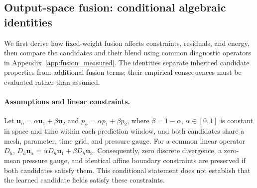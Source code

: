 
\subsection{Output-space fusion: conditional algebraic identities}
\label{app:fusion_consistency}

We first derive how fixed-weight fusion affects constraints, residuals,
and energy, then compare the candidates and their blend using common
diagnostic operators in Appendix~\ref{app:fusion_measured}. The identities
separate inherited candidate properties from additional fusion terms;
their empirical consequences must be evaluated rather than assumed.

\paragraph{Assumptions and linear constraints.}
Let $\bm u_\alpha=\alpha\bm u_1+\beta\bm u_2$ and
$p_\alpha=\alpha p_1+\beta p_2$, where $\beta=1-\alpha$,
$\alpha\in[0,1]$ is constant in space and time within each prediction
window, and both candidates share a mesh, parameter, time grid, and
pressure gauge. For a common linear operator $D_h$,
$D_h\bm u_\alpha=\alpha D_h\bm u_1+\beta D_h\bm u_2$.
Consequently, zero discrete divergence, a zero-mean pressure gauge,
and identical affine boundary constraints are preserved if both
candidates satisfy them. This conditional statement does not establish
that the learned candidate fields satisfy these constraints.

